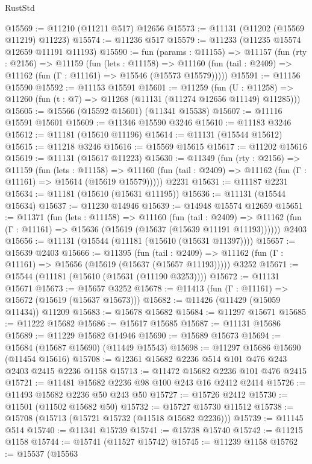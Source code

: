 \begin{lexlean}{RustStd}
\begin{coremodule}
@15569 := @11210 (@11211 @517) @12656
@15573 := @11131 (@11202 (@15569 @11219) @11223)
@15574 := @11236 @517
@15579 := @11233 (@11235 @15574 @12659 @11191 @11193)
@15590 := fun (params : @11155) =>
  @11157
    (fun (rty : @2156) =>
    @11159
      (fun (lets : @11158) =>
      @11160 (fun (tail : @2409) => @11162 (fun (Γ : @11161) => @15546 (@15573 @15579)))))
@15591 := @11156 @15590
@15592 := @11153 @15591
@15601 := @11259
    (fun (U : @11258) => @11260 (fun (t : @7) => @11268 (@11131 (@11274 @12656 @11149) @11285)))
@15605 := @15566 (@15592 @15601) (@11341 @15538)
@15607 := @11116 @15591 @15601
@15609 := @11346 @15590 @3246
@15610 := @11183 @3246
@15612 := @11181 (@15610 @11196)
@15614 := @11131 (@15544 @15612)
@15615 := @11218 @3246
@15616 := @15569 @15615
@15617 := @11202 @15616
@15619 := @11131 (@15617 @11223)
@15630 := @11349
    (fun (rty : @2156) =>
    @11159
      (fun (lets : @11158) =>
      @11160 (fun (tail : @2409) => @11162 (fun (Γ : @11161) => @15614 (@15619 @15579)))))
    @2231
@15631 := @11187 @2231
@15634 := @11181 (@15610 (@15631 @11195))
@15636 := @11131 (@15544 @15634)
@15637 := @11230 @14946
@15639 := @14948 @15574 @12659
@15651 := @11371
    (fun (lets : @11158) =>
    @11160
      (fun (tail : @2409) =>
      @11162 (fun (Γ : @11161) => @15636 (@15619 (@15637 (@15639 @11191 @11193))))))
    @2403
@15656 := @11131 (@15544 (@11181 (@15610 (@15631 @11397))))
@15657 := @15639 @2403
@15666 := @11395
    (fun (tail : @2409) => @11162 (fun (Γ : @11161) => @15656 (@15619 (@15637 (@15657 @11193)))))
    @3252
@15671 := @15544 (@11181 (@15610 (@15631 (@11190 @3253))))
@15672 := @11131 @15671
@15673 := @15657 @3252
@15678 := @11413 (fun (Γ : @11161) => @15672 (@15619 (@15637 @15673)))
@15682 := @11426 (@11429 (@15059 @11434)) @11209
@15683 := @15678 @15682
@15684 := @11297 @15671
@15685 := @11222 @15682
@15686 := @15617 @15685
@15687 := @11131 @15686
@15689 := @11229 @15682 @14946
@15690 := @15689 @15673
@15694 := @15684 (@15687 @15690) (@11449 @15543)
@15698 := @11297 @15686 @15690 (@11454 @15616)
@15708 := @12361 @15682 @2236 @514 @101 @476 @243 @2403 @2415 @2236 @1158
@15713 := @11472 @15682 @2236 @101 @476 @2415
@15721 := @11481 @15682 @2236 @98 @100 @243 @16 @2412 @2414
@15726 := @11493 @15682 @2236 @50 @243 @50
@15727 := @15726 @2412
@15730 := @11501 (@11502 @15682 @50)
@15732 := @15727 @15730 @11512
@15738 := @15708 (@15713 (@15721 @15732 (@11518 @15682 @2236)))
@15739 := @11145 @514
@15740 := @11341 @15739
@15741 := @15738 @15740
@15742 := @11215 @1158
@15744 := @15741 (@11527 @15742)
@15745 := @11239 @1158
@15762 := @15537
    (@15563

\end{coremodule}
\end{lexlean}

